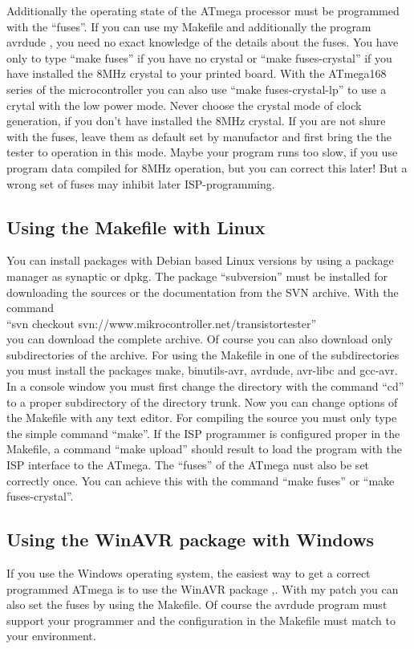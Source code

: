 Additionally the operating state of the
ATmega processor must be programmed with the ``fuses''.
If you can use my Makefile and additionally the program avrdude \cite{avrdude}, you need no exact
knowledge of the details about the fuses. You have only to type ``make fuses'' if you
have no crystal or ``make fuses-crystal'' if you have installed the 8MHz crystal to your printed board.
With the ATmega168 series of the microcontroller you can also use ``make fuses-crystal-lp'' to use
a crytal with the low power mode.
Never choose the crystal mode of clock generation, if you don't have installed
the 8MHz crystal. If you are not shure with the fuses, leave them as default
set by manufactor and first bring the the tester to operation in this mode.
Maybe your program runs too slow, if you use program data compiled for
8MHz operation, but you can correct this later! But a wrong set of fuses may inhibit
later ISP-programming.

\subsection{Using the Makefile with Linux}
You can install packages with Debian based Linux versions by using a package manager as synaptic or dpkg.
The package ``subversion'' must be installed for downloading the sources or the documentation from the SVN archive.
With the command \\
``svn checkout svn://www.mikrocontroller.net/transistortester'' \\
you can download the complete archive.
Of course you can also download only subdirectories of the archive.
For using the Makefile in one of the subdirectories you must install the packages
make, binutils-avr, avrdude, avr-libc and gcc-avr.
In a console window you must first change the directory with the command ``cd'' to a proper
subdirectory of the directory trunk.
Now you can change options of the Makefile with any text editor.
For compiling the source you must only type the simple command ``make''.
If the ISP programmer is configured proper in the Makefile, a command ``make upload''
should result to load the program with the ISP interface to the ATmega.
The ``fuses'' of the ATmega nust also be set correctly once.
You can achieve this with the command ``make fuses'' or ``make fuses-crystal''.

\subsection{Using the WinAVR package with Windows}
If you use the Windows operating system, the easiest way to get a correct programmed
ATmega is to use the WinAVR package \cite{winavr1},\cite{winavr2}.
With my patch \cite{winavr3} you can also set the fuses by using the Makefile.
Of course the avrdude program must support your programmer and the configuration
in the Makefile must match to your environment.

